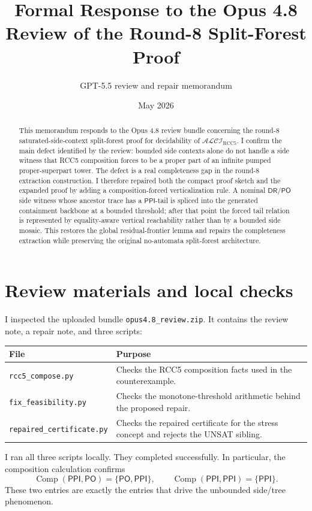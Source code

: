 \documentclass[11pt]{article}
\title{Formal Response to the Opus 4.8 Review of the Round-8 Split-Forest Proof}
\author{GPT-5.5 review and repair memorandum}
\date{May 2026}
\newcommand{\Logic}{\mathcal{ALCI}_{\mathrm{RCC5}}}
\newcommand{\DR}{\mathsf{DR}}
\newcommand{\PO}{\mathsf{PO}}
\newcommand{\PPI}{\mathsf{PPI}}
\newcommand{\comp}{\operatorname{Comp}}
\begin{document}
\maketitle

\begin{abstract}
This memorandum responds to the Opus 4.8 review bundle concerning the round-8 saturated-side-context split-forest proof for decidability of \(\Logic\).  I confirm the main defect identified by the review: bounded side contexts alone do not handle a side witness that RCC5 composition forces to be a proper part of an infinite pumped proper-superpart tower.  The defect is a real completeness gap in the round-8 extraction construction.  I therefore repaired both the compact proof sketch and the expanded proof by adding a composition-forced verticalization rule.  A nominal \(\DR/\PO\) side witness whose ancestor trace has a \(\PPI\)-tail is spliced into the generated containment backbone at a bounded threshold; after that point the forced tail relation is represented by equality-aware vertical reachability rather than by a bounded side mosaic.  This restores the global residual-frontier lemma and repairs the completeness extraction while preserving the original no-automata split-forest architecture.
\end{abstract}

\tableofcontents

\section{Review materials and local checks}

I inspected the uploaded bundle \texttt{opus4.8\_review.zip}.  It contains the review note, a repair note, and three scripts:
\begin{center}
\begin{tabular}{ll}
\toprule
File & Purpose \\
\midrule
\texttt{rcc5\_compose.py} & Checks the RCC5 composition facts used in the counterexample. \\
\texttt{fix\_feasibility.py} & Checks the monotone-threshold arithmetic behind the proposed repair. \\
\texttt{repaired\_certificate.py} & Checks the repaired certificate for the stress concept and rejects the UNSAT sibling. \\
\bottomrule
\end{tabular}
\end{center}

I ran all three scripts locally.  They completed successfully.  In particular, the composition calculation confirms
\[
  \comp(\PPI,\PO)=\{\PO,\PPI\},
  \qquad
  \comp(\PPI,\PPI)=\{\PPI\}.
\]
These two entries are exactly the entries that drive the unbounded side/tree phenomenon.
\end{document}
